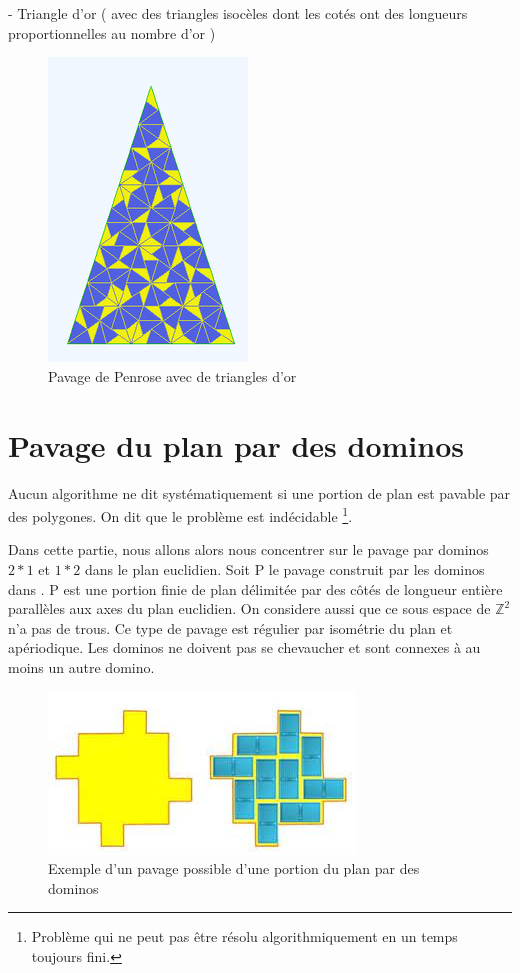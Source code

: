 \documentclass{article}
\begin{document}
- Triangle d’or ( avec des triangles isocèles dont les cotés ont des longueurs proportionnelles au nombre d’or )

\begin{figure} [h]
    \center
    \includegraphics [scale=0.5] {image/penrose_tri.png}
    \caption{Pavage de Penrose avec de triangles d'or}
\end{figure}

\newpage

\section{Pavage du plan par des dominos}

Aucun algorithme ne dit systématiquement si une portion de plan est pavable par des polygones.
On dit que le problème est indécidable \footnote{Problème qui ne peut pas être résolu algorithmiquement en un temps toujours fini.}.

Dans cette partie, nous allons alors nous concentrer sur le pavage par dominos $2*1$ et $1*2$ dans le plan euclidien.
Soit P le pavage construit par les dominos dans . P est une portion finie de plan délimitée par des côtés de longueur entière parallèles aux axes du plan euclidien.
On considere aussi que ce sous espace de $\mathbb{Z}^{2}$ n’a pas de trous. Ce type de pavage est régulier par isométrie du plan et apériodique.
Les dominos ne doivent pas se chevaucher et sont connexes à au moins un autre domino.

\begin{figure} [h]
    \center
    \includegraphics [scale=0.5] {image/pavage_domino.jpg}
    \caption{Exemple d'un pavage possible d'une portion du plan par des dominos }
\end{figure}
\end{document}

